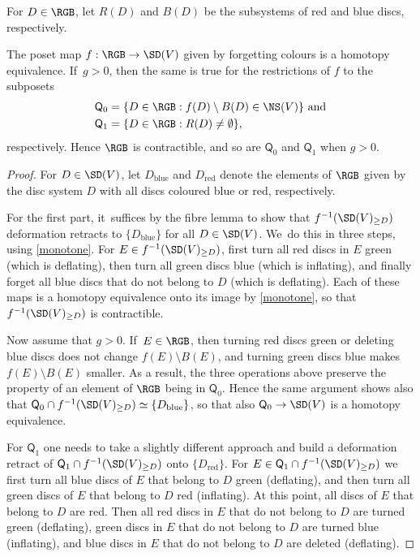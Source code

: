 For $D \in \RGB$, let $R(D)$ and $B(D)$ be the subsystems of red and blue discs, respectively.

\begin{prop}\label{p:colour_forgetting_maps}
The poset map $f: \RGB \to \SD(V)$ given by forgetting colours is a homotopy equivalence. If~$g>0$, then the same is true for the restrictions of $f$ to the subposets
\begin{align*}
{\mathsf Q_0} &= \{D \in \RGB : f(D) \setminus B(D) \in \NS(V) \} \text{ and} \\
{\mathsf Q_1} &= \{D \in \RGB : R(D) \neq \emptyset \},
\end{align*}
respectively. Hence $\RGB$ is contractible, and so are $\mathsf Q_0$ and $\mathsf Q_1$ when $g>0$.
\end{prop}

\begin{proof}For $D \in \SD(V)$, let $D_{\mathrm{blue}}$ and $D_{\mathrm{red}}$ denote the elements of $\RGB$ given by the disc system $D$ with all discs coloured blue or red, respectively.

For the first part, it~suffices by the fibre lemma to show that $f^{-1}(\SD(V)_{\geq D})$ deformation retracts to $\{D_{\mathrm{blue}}\}$ for all $D \in \SD(V)$. We~do this in three steps, using \cref{monotone}. For $E \in f^{-1}(\SD(V)_{\geq D})$, first turn all red discs in $E$ green (which is deflating), then turn all green discs blue (which is inflating), and finally forget all blue discs that do not belong to $D$ (which is deflating). Each of these maps is a homotopy equivalence onto its image by \cref{monotone}, so that $f^{-1}(\SD(V)_{\geq D})$ is contractible.

Now assume that $g>0$. If~$E \in \RGB$, then turning red discs green or deleting blue discs does not change $f(E) \setminus B(E)$, and turning green discs blue makes $f(E) \setminus B(E)$ smaller. As a result, the three operations above preserve the property of an element of $\RGB$ being in $\mathsf Q_0$. Hence the same argument shows also that $\mathsf Q_0 \cap f^{-1}(\SD(V)_{\geq D}) \simeq \{D_{\mathrm{blue}}\}$, so that also $\mathsf Q_0 \to \SD(V)$ is a homotopy equivalence.

For $\mathsf Q_1$ one needs to take a slightly different approach and build a deformation retract of $\mathsf Q_1 \cap f^{-1}(\SD(V)_{\geq D})$ onto $\{D_{\mathrm{red}}\}$. For $E \in \mathsf Q_1 \cap f^{-1}(\SD(V)_{\geq D})$ we first turn all blue discs of $E$ that belong to $ D$ green (deflating), and then turn all green discs of $E$ that belong to $ D$ red (inflating). At this point, all discs of $E$ that belong to $D$ are red. Then all red discs in $E$ that do not belong to $D$ are turned green (deflating), green discs in $E$ that do not belong to $D$ are turned blue (inflating), and blue discs in $E$ that do not belong to $D$ are deleted (deflating). \end{proof}

